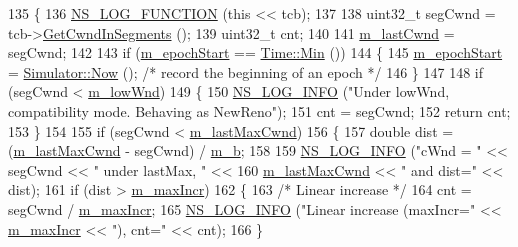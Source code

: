\begin{DoxyCode}
135 \{
136   \hyperlink{log-macros-disabled_8h_a90b90d5bad1f39cb1b64923ea94c0761}{NS\_LOG\_FUNCTION} (\textcolor{keyword}{this} << tcb);
137 
138   uint32\_t segCwnd = tcb->\hyperlink{classns3_1_1TcpSocketState_ab6dfe309ca53fd3207dcafede75ad12d}{GetCwndInSegments} ();
139   uint32\_t cnt;
140 
141   \hyperlink{classns3_1_1TcpBic_a5014112a75f21b8bc1a0e50b79ab4e31}{m\_lastCwnd} = segCwnd;
142 
143   \textcolor{keywordflow}{if} (\hyperlink{classns3_1_1TcpBic_ae0f10aaccd31702d06dc3fb76450ac38}{m\_epochStart} == \hyperlink{classns3_1_1Time_a75169ee37c557c616eb79e1a15ed09b7}{Time::Min} ())
144     \{
145       \hyperlink{classns3_1_1TcpBic_ae0f10aaccd31702d06dc3fb76450ac38}{m\_epochStart} = \hyperlink{classns3_1_1Simulator_ac3178fa975b419f7875e7105be122800}{Simulator::Now} ();   \textcolor{comment}{/* record the beginning of an epoch */}
146     \}
147 
148   \textcolor{keywordflow}{if} (segCwnd < \hyperlink{classns3_1_1TcpBic_a1a7a6a7c186075fba672ff3328eb85ec}{m\_lowWnd})
149     \{
150       \hyperlink{group__logging_gafbd73ee2cf9f26b319f49086d8e860fb}{NS\_LOG\_INFO} (\textcolor{stringliteral}{"Under lowWnd, compatibility mode. Behaving as NewReno"});
151       cnt = segCwnd;
152       \textcolor{keywordflow}{return} cnt;
153     \}
154 
155   \textcolor{keywordflow}{if} (segCwnd < \hyperlink{classns3_1_1TcpBic_a082025c05e83dcddab77a6e3209cd4eb}{m\_lastMaxCwnd})
156     \{
157       \textcolor{keywordtype}{double} dist = (\hyperlink{classns3_1_1TcpBic_a082025c05e83dcddab77a6e3209cd4eb}{m\_lastMaxCwnd} - segCwnd) / \hyperlink{classns3_1_1TcpBic_a3f94d435d1b4821077da9acb72fd8d5f}{m\_b};
158 
159       \hyperlink{group__logging_gafbd73ee2cf9f26b319f49086d8e860fb}{NS\_LOG\_INFO} (\textcolor{stringliteral}{"cWnd = "} << segCwnd << \textcolor{stringliteral}{" under lastMax, "} <<
160                    \hyperlink{classns3_1_1TcpBic_a082025c05e83dcddab77a6e3209cd4eb}{m\_lastMaxCwnd} << \textcolor{stringliteral}{" and dist="} << dist);
161       \textcolor{keywordflow}{if} (dist > \hyperlink{classns3_1_1TcpBic_a79db4e8443cc0a27388a80566327a5a0}{m\_maxIncr})
162         \{
163           \textcolor{comment}{/* Linear increase */}
164           cnt = segCwnd / \hyperlink{classns3_1_1TcpBic_a79db4e8443cc0a27388a80566327a5a0}{m\_maxIncr};
165           \hyperlink{group__logging_gafbd73ee2cf9f26b319f49086d8e860fb}{NS\_LOG\_INFO} (\textcolor{stringliteral}{"Linear increase (maxIncr="} << \hyperlink{classns3_1_1TcpBic_a79db4e8443cc0a27388a80566327a5a0}{m\_maxIncr} << \textcolor{stringliteral}{"), cnt="} << cnt);
166         \}

\end{DoxyCode}
